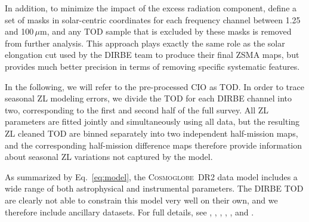 \documentclass[twocolumn]{aa}
\newcommand{\cosmoglobe}{\textsc{Cosmoglobe}}
\begin{document}
In addition, to minimize the impact of the excess radiation component,
\citet{CG02_01} define a set of masks in solar-centric coordinates for
each frequency channel between 1.25 and 100\,$\mu$m, and any TOD
sample that is excluded by these masks is removed from further
analysis. This approach plays exactly the same role as the solar
elongation cut used by the DIRBE team to produce their final ZSMA
maps, but provides much better precision in terms of removing specific
systematic features.

In the following, we will refer to the pre-processed CIO as TOD.  
In order to trace seasonal ZL modeling errors, we divide the TOD for
each DIRBE channel into two, corresponding to the first and second
half of the full survey. All ZL parameters are fitted jointly and
simultaneously using all data, but the resulting ZL cleaned TOD are
binned separately into two independent half-mission maps, and the
corresponding half-mission difference maps therefore provide
information about seasonal ZL variations not captured by the model.

As summarized by Eq.~\eqref{eq:model}, the \cosmoglobe\ DR2 data model
includes a wide range of both astrophysical and instrumental
parameters. The DIRBE TOD are clearly not able to constrain this
model very well on their own, and we therefore include 
ancillary datasets. For full details, see
\citet{CG02_01}, \citet{CG02_03}, \citet{CG02_04}, \citet{CG02_05}, \citet{CG02_06}, and \citet{CG02_07}.
\end{document}
